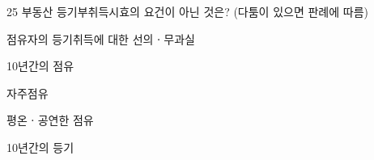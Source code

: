 \begin{question}{25}
부동산 등기부취득시효의 요건이 아닌 것은? (다툼이 있으면 판례에 따름)
\begin{choices}
  \item 점유자의 등기취득에 대한 선의ㆍ무과실
  \item 10년간의 점유
  \item 자주점유
  \item 평온ㆍ공연한 점유
  \item 10년간의 등기
\end{choices}
\end{question}
